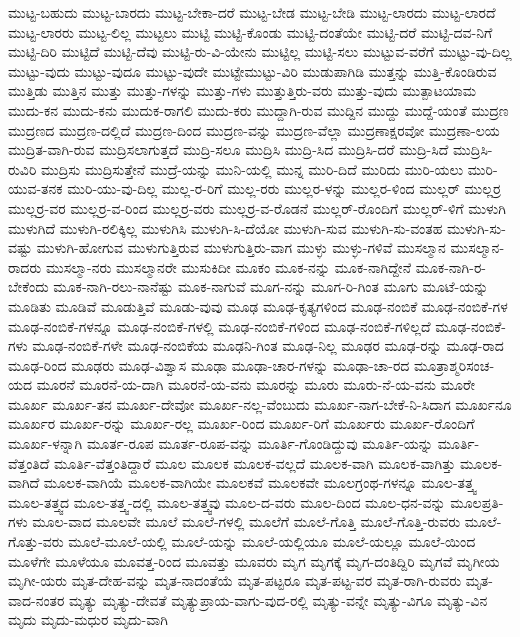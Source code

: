 {ಮುಟ್ಟ-ಬಹುದು
ಮುಟ್ಟ-ಬಾರದು
ಮುಟ್ಟ-ಬೇಕಾ-ದರೆ
ಮುಟ್ಟ-ಬೇಡ
ಮುಟ್ಟ-ಬೇಡಿ
ಮುಟ್ಟ-ಲಾರದು
ಮುಟ್ಟ-ಲಾರದೆ
ಮುಟ್ಟ-ಲಾರರು
ಮುಟ್ಟ-ಲಿಲ್ಲ
ಮುಟ್ಟಲು
ಮುಟ್ಟಿ
ಮುಟ್ಟಿ-ಕೊಂಡು
ಮುಟ್ಟಿ-ದಂತೆಯೇ
ಮುಟ್ಟಿ-ದರೆ
ಮುಟ್ಟಿ-ದವ-ನಿಗೆ
ಮುಟ್ಟಿ-ದಿರಿ
ಮುಟ್ಟಿದೆ
ಮುಟ್ಟಿ-ದೆವು
ಮುಟ್ಟಿ-ರು-ವಿ-ಯೇನು
ಮುಟ್ಟಿಲ್ಲ
ಮುಟ್ಟಿ-ಸಲು
ಮುಟ್ಟುವ-ವರೆಗೆ
ಮುಟ್ಟು-ವು-ದಿಲ್ಲ
ಮುಟ್ಟು-ವುದು
ಮುಟ್ಟು-ವುದೂ
ಮುಟ್ಟು-ವುದೇ
ಮುಟ್ಟೇಮುಟ್ಟು-ವಿರಿ
ಮುಡುಪಾಗಿಡಿ
ಮುತ್ತನ್ನು
ಮುತ್ತಿ-ಕೊಂಡಿರುವ
ಮುತ್ತಿಡು
ಮುತ್ತಿನ
ಮುತ್ತು
ಮುತ್ತು-ಗಳನ್ನು
ಮುತ್ತು-ಗಳು
ಮುತ್ತುತ್ತಿರು-ವರು
ಮುತ್ತು-ವುದು
ಮುತ್ಪಾಟಯಾಮ
ಮುದು-ಕನ
ಮುದು-ಕನು
ಮುದುಕ-ರಾಗಲಿ
ಮುದು-ಕರು
ಮುದ್ದಾಗಿ-ರುವ
ಮುದ್ದಿನ
ಮುದ್ದು
ಮುದ್ದೆ-ಯಂತೆ
ಮುದ್ರಣ
ಮುದ್ರಣದ
ಮುದ್ರಣ-ದಲ್ಲಿದೆ
ಮುದ್ರಣ-ದಿಂದ
ಮುದ್ರಣ-ವನ್ನು
ಮುದ್ರಣ-ವೆಲ್ಲಾ
ಮುದ್ರಣಾಕ್ಷರವೋ
ಮುದ್ರಣಾ-ಲಯ
ಮುದ್ರಿತ-ವಾಗಿ-ರುವ
ಮುದ್ರಿಸಲಾಗುತ್ತದೆ
ಮುದ್ರಿ-ಸಲೂ
ಮುದ್ರಿಸಿ
ಮುದ್ರಿ-ಸಿದ
ಮುದ್ರಿಸಿ-ದರೆ
ಮುದ್ರಿ-ಸಿದೆ
ಮುದ್ರಿಸಿ-ರುವಿರಿ
ಮುದ್ರಿಸು
ಮುದ್ರಿಸುತ್ತೇನೆ
ಮುದ್ರೆ-ಯನ್ನು
ಮುನಿ-ಯಲ್ಲಿ
ಮುನ್ನ
ಮುರಿ-ದಿದೆ
ಮುರಿದು
ಮುರಿ-ಯಲು
ಮುರಿ-ಯುವ-ತನಕ
ಮುರಿ-ಯು-ವು-ದಿಲ್ಲ
ಮುಲ್ಲ-ರ-ರಿಗೆ
ಮುಲ್ಲ-ರರು
ಮುಲ್ಲರ-ಳನ್ನು
ಮುಲ್ಲರ-ಳಿಂದ
ಮುಲ್ಲರ್
ಮುಲ್ಲರ್ರ
ಮುಲ್ಲರ್ರ-ವರ
ಮುಲ್ಲರ್ರ-ವ-ರಿಂದ
ಮುಲ್ಲರ್ರ-ವರು
ಮುಲ್ಲರ್ರ-ವ-ರೊಡನೆ
ಮುಲ್ಲರ್-ರೊಂದಿಗೆ
ಮುಲ್ಲರ್-ಳಿಗೆ
ಮುಳುಗಿ
ಮುಳುಗಿದೆ
ಮುಳುಗಿ-ರಲಿಕ್ಕಿಲ್ಲ
ಮುಳುಗಿಸಿ
ಮುಳುಗಿ-ಸಿ-ದೆಯೋ
ಮುಳುಗಿ-ಸುವ
ಮುಳುಗಿ-ಸು-ವಂತಹ
ಮುಳುಗಿ-ಸು-ವಷ್ಟು
ಮುಳುಗಿ-ಹೋಗುವ
ಮುಳುಗುತ್ತಿರುವ
ಮುಳುಗುತ್ತಿರು-ವಾಗ
ಮುಳ್ಳು
ಮುಳ್ಳು-ಗಳಿವೆ
ಮುಸಲ್ಮಾನ
ಮುಸಲ್ಮಾನ-ರಾದರು
ಮುಸಲ್ಮಾ-ನರು
ಮುಸಲ್ಮಾನರೇ
ಮುಸುಕಿದೀ
ಮೂಕಂ
ಮೂಕ-ನನ್ನು
ಮೂಕ-ನಾಗಿದ್ದೇನೆ
ಮೂಕ-ನಾಗಿ-ರ-ಬೇಕೆಂದು
ಮೂಕ-ನಾಗಿ-ರಲು-ನಾನೆಷ್ಟು
ಮೂಕ-ನಾಗುವೆ
ಮೂಗ-ನನ್ನು
ಮೂಗ-ರಿ-ಗಿಂತ
ಮೂಗು
ಮೂಟೆ-ಯನ್ನು
ಮೂಡಿತು
ಮೂಡಿವೆ
ಮೂಡುತ್ತಿವೆ
ಮೂಡು-ವುವು
ಮೂಢ
ಮೂಢ-ಕೃತ್ಯಗಳಿಂದ
ಮೂಢ-ನಂಬಿಕೆ
ಮೂಢ-ನಂಬಿಕೆ-ಗಳ
ಮೂಢ-ನಂಬಿಕೆ-ಗಳನ್ನೂ
ಮೂಢ-ನಂಬಿಕೆ-ಗಳಲ್ಲಿ
ಮೂಢ-ನಂಬಿಕೆ-ಗಳಿಂದ
ಮೂಢ-ನಂಬಿಕೆ-ಗಳಿಲ್ಲದೆ
ಮೂಢ-ನಂಬಿಕೆ-ಗಳು
ಮೂಢ-ನಂಬಿಕೆ-ಗಳೇ
ಮೂಢ-ನಂಬಿಕೆಯ
ಮೂಢನಿ-ಗಿಂತ
ಮೂಢ-ನಿಲ್ಲ
ಮೂಢರ
ಮೂಢ-ರನ್ನು
ಮೂಢ-ರಾದ
ಮೂಢ-ರಿಂದ
ಮೂಢರು
ಮೂಢ-ವಿಶ್ವಾಸ
ಮೂಢಾ
ಮೂಢಾ-ಚಾರ-ಗಳನ್ನು
ಮೂಢಾ-ಚಾ-ರದ
ಮೂತ್ರಾಶ್ಮರಿಸಂಚ-ಯದ
ಮೂರನೆ
ಮೂರನೆ-ಯ-ದಾಗಿ
ಮೂರನೆ-ಯ-ವನು
ಮೂರನ್ನು
ಮೂರು
ಮೂರು-ನೆ-ಯ-ವನು
ಮೂರೇ
ಮೂರ್ಖ
ಮೂರ್ಖ-ತನ
ಮೂರ್ಖ-ದೇವೋ
ಮೂರ್ಖ-ನಲ್ಲ-ವೆಂಬುದು
ಮೂರ್ಖ-ನಾಗ-ಬೇಕೆ-ನಿ-ಸಿದಾಗ
ಮೂರ್ಖನೂ
ಮೂರ್ಖರ
ಮೂರ್ಖ-ರನ್ನು
ಮೂರ್ಖ-ರಲ್ಲ
ಮೂರ್ಖ-ರಿಂದ
ಮೂರ್ಖ-ರಿಗೆ
ಮೂರ್ಖರು
ಮೂರ್ಖ-ರೊಂದಿಗೆ
ಮೂರ್ಖ-ಳನ್ನಾಗಿ
ಮೂರ್ತ-ರೂಪ
ಮೂರ್ತ-ರೂಪ-ವನ್ನು
ಮೂರ್ತಿ-ಗೊಂಡಿದ್ದುವು
ಮೂರ್ತಿ-ಯನ್ನು
ಮೂರ್ತಿ-ವೆತ್ತಂತಿದೆ
ಮೂರ್ತಿ-ವೆತ್ತಂತಿದ್ದಾರೆ
ಮೂಲ
ಮೂಲಕ
ಮೂಲಕ-ವಲ್ಲದೆ
ಮೂಲಕ-ವಾಗಿ
ಮೂಲಕ-ವಾಗಿತ್ತು
ಮೂಲಕ-ವಾಗಿದೆ
ಮೂಲಕ-ವಾಗಿಯೆ
ಮೂಲಕ-ವಾಗಿಯೇ
ಮೂಲಕವೆ
ಮೂಲಕವೇ
ಮೂಲಗ್ರಂಥ-ಗಳನ್ನೂ
ಮೂಲ-ತತ್ತ್ವ
ಮೂಲ-ತತ್ತ್ವದ
ಮೂಲ-ತತ್ತ್ವ-ದಲ್ಲಿ
ಮೂಲ-ತತ್ತ್ವವು
ಮೂಲ-ದ-ವರು
ಮೂಲ-ದಿಂದ
ಮೂಲ-ಧನ-ವನ್ನು
ಮೂಲಪ್ರತಿ-ಗಳು
ಮೂಲ-ವಾದ
ಮೂಲವೇ
ಮೂಲೆ
ಮೂಲೆ-ಗಳಲ್ಲಿ
ಮೂಲೆಗೆ
ಮೂಲೆ-ಗೊತ್ತಿ
ಮೂಲೆ-ಗೊತ್ತಿ-ರುವರು
ಮೂಲೆ-ಗೊತ್ತು-ವರು
ಮೂಲೆ-ಮೂಲೆ-ಯಲ್ಲಿ
ಮೂಲೆ-ಯನ್ನು
ಮೂಲೆ-ಯಲ್ಲಿಯೂ
ಮೂಲೆ-ಯಲ್ಲೂ
ಮೂಲೆ-ಯಿಂದ
ಮೂಳೆಗೇ
ಮೂಳೆಯೂ
ಮೂವತ್ತ-ರಿಂದ
ಮೂವತ್ತು
ಮೂವರು
ಮೃಗ
ಮೃಗಕ್ಕೆ
ಮೃಗ-ದಂತಿದ್ದಿರಿ
ಮೃಗವೆ
ಮೃಗೀಯ
ಮೃಗೀ-ಯರು
ಮೃತ-ದೇಹ-ವನ್ನು
ಮೃತ-ನಾದಂತೆಯೆ
ಮೃತ-ಪಟ್ಟರೂ
ಮೃತ-ಪಟ್ಟ-ವರ
ಮೃತ-ರಾಗಿ-ರುವರು
ಮೃತ-ವಾದ-ನಂತರ
ಮೃತ್ಯು
ಮೃತ್ಯು-ದೇವತೆ
ಮೃತ್ಯುಪ್ರಾಯ-ವಾಗು-ವುದ-ರಲ್ಲಿ
ಮೃತ್ಯು-ವನ್ನೇ
ಮೃತ್ಯು-ವಿಗೂ
ಮೃತ್ಯು-ವಿನ
ಮೃದು
ಮೃದು-ಮಧುರ
ಮೃದು-ವಾಗಿ
}
